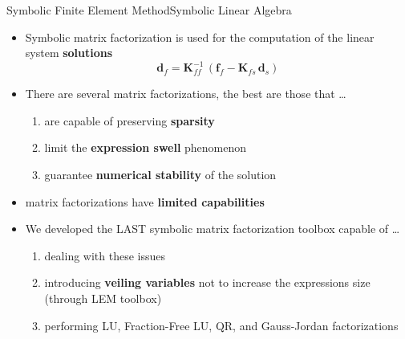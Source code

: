 \begin{frame}{Symbolic Finite Element Method}{Symbolic Linear Algebra}
  \begin{itemize}
    \item Symbolic matrix factorization is used for the computation of the linear system \textbf{solutions}
    \begin{equation*}
      \mathbf{d}_{f} = \mathbf{K}_{ff}^{-1}\,\left(\mathbf{f}_{f} - \mathbf{K}_{fs}\,\mathbf{d}_{s}\right)
    \end{equation*}
    \item There are several matrix factorizations, the best are those that \dots
    \begin{enumerate}
      \item are capable of preserving \textbf{sparsity}
      \item limit the \textbf{expression swell} phenomenon
      \item guarantee \textbf{numerical stability} of the solution
    \end{enumerate}
    \item \Maple{} matrix factorizations have \textbf{limited capabilities}
    \item We developed the \acs{LAST} symbolic matrix factorization toolbox capable of \dots
    \begin{enumerate}
      \item dealing with these \Maple{} issues
      \item introducing \textbf{veiling variables} not to increase the expressions size (through \acs{LEM} toolbox)
      \item performing LU, Fraction-Free LU, QR, and Gauss-Jordan factorizations
    \end{enumerate}
  \end{itemize}
\end{frame}

